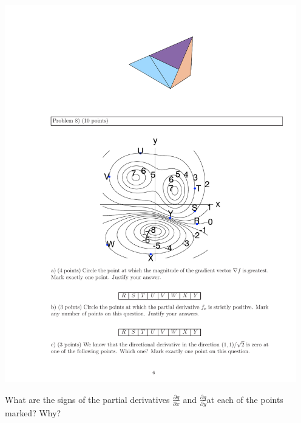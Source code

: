 \documentclass[M3_Night4_Solutions]{subfiles}
\begin{document}
\includegraphics[width=5in]{figs/LevelCurves} 

\be
\item
What are the signs of the partial derivatives $\frac{\partial g}{\partial x}$ and 
$\frac{\partial g}{\partial y}$at each of the points marked? Why?
\end{document}
